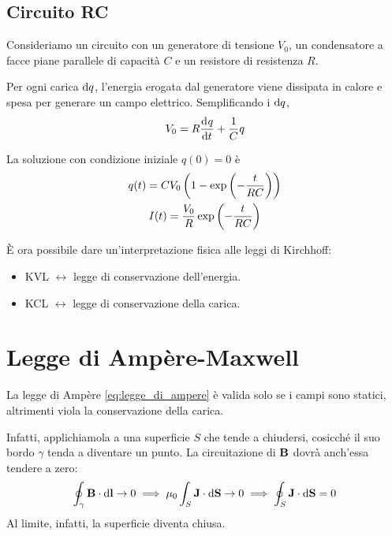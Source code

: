 \subsection{Circuito RC}

Consideriamo un circuito con
un generatore di tensione $V_0$,
un condensatore a facce piane parallele di capacità $C$
e un resistore di resistenza $R$.

Per ogni carica $\mathrm{d} q$, l'energia erogata dal generatore viene dissipata in calore e spesa per generare un campo elettrico.
Semplificando i $\mathrm{d} q$,
\begin{equation}
    V_0 = R \der[q]{t} + \frac{1}{C} q
\end{equation}

La soluzione con condizione iniziale $q(0) = 0$ è
\begin{subequations}
\begin{gather}
    q(t) = C V_0 \left( 1 - \operatorname{exp}\left( -\frac{t}{RC} \right) \right) \\
    I(t) = \frac{V_0}{R} \operatorname{exp}\left( -\frac{t}{RC} \right)
\end{gather}
\end{subequations}

È ora possibile dare un'interpretazione fisica alle leggi di Kirchhoff:
\begin{itemize}
    \item KVL $\longleftrightarrow$ legge di conservazione dell'energia.
    \item KCL $\longleftrightarrow$ legge di conservazione della carica.
\end{itemize}

\section{Legge di Ampère-Maxwell}
\label{sec:ampere_maxwell}


La legge di Ampère \eqref{eq:legge_di_ampere} è valida solo se i campi sono statici, altrimenti viola la conservazione della carica.

Infatti, applichiamola a una superficie $S$ che tende a chiudersi, cosicché il suo bordo $\gamma$ tenda a diventare un punto.
La circuitazione di $\mathbf{B}$ dovrà anch'essa tendere a zero:
\begin{gather}
    \oint_\gamma \mathbf{B} \cdot \mathrm{d} \mathbf{l} \to 0
    \implies \mu_0 \int_S \mathbf{J} \cdot \mathrm{d} \mathbf{S} \to 0
    \implies \oint_S \mathbf{J} \cdot \mathrm{d} \mathbf{S} = 0
\end{gather}
Al limite, infatti, la superficie diventa chiusa.

